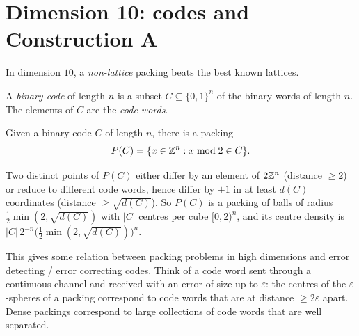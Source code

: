 \section{Dimension 10: codes and Construction A}
\label{L04b:sec:codes}

In dimension $10$, a \emph{non-lattice} packing beats the best known lattices.

\begin{definition}\label{L04b:def:code}
A \emph{binary code} of length $n$ is a subset $C\subseteq\{0,1\}^n$ of the binary words of length $n$.
The elements of $C$ are the \emph{code words}. 
\end{definition}

\begin{definition}[Construction A]\label{L04b:def:constrA}
Given a binary code $C$ of length $n$, there is a packing
\[
  P(C) = \{x\in\mathbb{Z}^n : x \bmod 2 \in C\}.
\]
\end{definition}
\begin{addedblock}
Two distinct points of $P(C)$ either differ by an element of $2\mathbb{Z}^n$ (distance $\ge2$) or reduce to
different code words, hence differ by $\pm1$ in at least $d(C)$ coordinates (distance $\ge\sqrt{d(C)}$).
So $P(C)$ is a packing of balls of radius $\frac12\min(2,\sqrt{d(C)})$ with $|C|$ centres per cube
$[0,2)^n$, and its centre density is $|C|\,2^{-n}\big(\tfrac12\min(2,\sqrt{d(C)})\big)^n$.
\end{addedblock}

This gives some relation between packing problems in high dimensions and error detecting /
error correcting codes. Think of a code word sent through a continuous channel and received
with an error of size up to $\varepsilon$: the centres of the $\varepsilon$-spheres of a packing correspond
to code words that are at distance $\ge 2\varepsilon$ apart. Dense packings correspond to large collections of
code words that are well separated.

